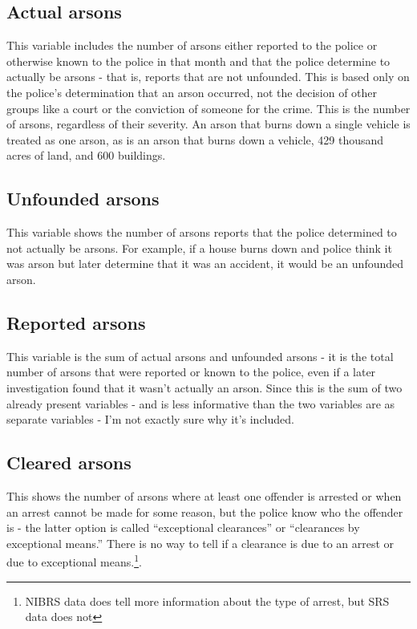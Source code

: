 \documentclass[
]{krantz}
\begin{document}
\subsection{Actual arsons}\label{actual-arsons}

This variable includes the number of arsons either reported
to the police or otherwise known to the police in that month
and that the police determine to actually be arsons - that
is, reports that are not unfounded. This is based only on
the police's determination that an arson occurred, not the
decision of other groups like a court or the conviction of
someone for the crime. This is the number of arsons,
regardless of their severity. An arson that burns down a
single vehicle is treated as one arson, as is an arson that
burns down a vehicle, 429 thousand acres of land, and 600
buildings.

\subsection{Unfounded arsons}\label{unfounded-arsons}

This variable shows the number of arsons reports that the
police determined to not actually be arsons. For example, if
a house burns down and police think it was arson but later
determine that it was an accident, it would be an unfounded
arson.

\subsection{Reported arsons}\label{reported-arsons}

This variable is the sum of actual arsons and unfounded
arsons - it is the total number of arsons that were reported
or known to the police, even if a later investigation found
that it wasn't actually an arson. Since this is the sum of
two already present variables - and is less informative than
the two variables are as separate variables - I'm not
exactly sure why it's included.

\subsection{Cleared arsons}\label{cleared-arsons}

This shows the number of arsons where at least one offender
is arrested or when an arrest cannot be made for some
reason, but the police know who the offender is - the latter
option is called ``exceptional clearances'' or ``clearances
by exceptional means.'' There is no way to tell if a
clearance is due to an arrest or due to exceptional
means.\footnote{NIBRS data does tell more information about
  the type of arrest, but SRS data does not}.
\end{document}
